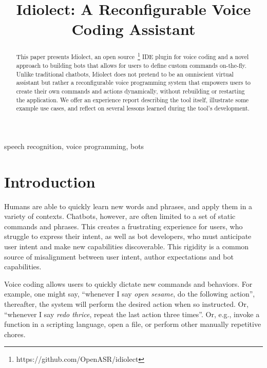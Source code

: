 \documentclass[conference]{IEEEtran}
\begin{document}
\title{Idiolect: A Reconfigurable Voice Coding Assistant}

\author{
\and
{}
\and
{}
}

\maketitle

\begin{abstract}
    This paper presents Idiolect, an open source~\footnote{https://github.com/OpenASR/idiolect} IDE plugin for voice coding and a novel approach to building bots that allows for users to define custom commands on-the-fly. Unlike traditional chatbots, Idiolect does not pretend to be an omniscient virtual assistant but rather a reconfigurable voice programming system that empowers users to create their own commands and actions dynamically, without rebuilding or restarting the application. We offer an experience report describing the tool itself, illustrate some example use cases, and reflect on several lessons learned during the tool's development.
\end{abstract}

\begin{IEEEkeywords}
    speech recognition, voice programming, bots
\end{IEEEkeywords}

\section{Introduction}

Humans are able to quickly learn new words and phrases, and apply them in a variety of contexts. Chatbots, however, are often limited to a set of static commands and phrases. This creates a frustrating experience for users, who struggle to express their intent, as well as bot developers, who must anticipate user intent and make new capabilities discoverable. This rigidity is a common source of misalignment between user intent, author expectations and bot capabilities.

Voice coding allows users to quickly dictate new commands and behaviors. For example, one might say, ``whenever I say \textit{open sesame}, do the following action'', thereafter, the system will perform the desired action when so instructed. Or, ``whenever I say \textit{redo thrice}, repeat the last action three times''. Or, e.g., invoke a function in a scripting language, open a file, or perform other manually repetitive chores.
\end{document}
